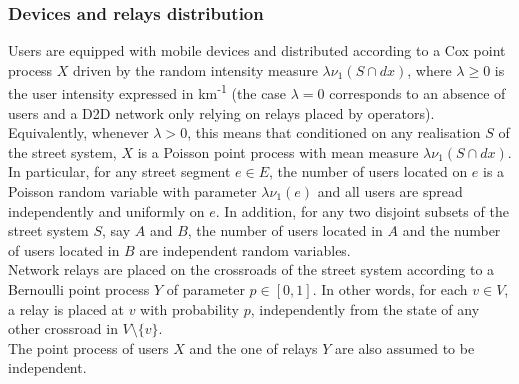 \documentclass[conference]{IEEEtran}
\begin{document}
\subsubsection{Devices and relays distribution}
\indent Users are equipped with mobile devices and distributed according to a Cox point process $X$ driven by the random intensity measure $\lambda \nu_{1}(S \cap dx)$, where $\lambda \geq 0$ is the user intensity expressed in km\textsuperscript{-1} (the case $\lambda = 0$ corresponds to an absence of users and a D2D network only relying on relays placed by operators). Equivalently, whenever $\lambda > 0$, this means that conditioned on any realisation $S$ of the street system, $X$ is a Poisson point process with mean measure $\lambda \nu_{1}(S \cap dx)$. In particular, for any street segment $e \in E$, the number of users located on $e$ is a Poisson random variable with parameter $\lambda \nu_{1}(e)$ and all users are spread independently and uniformly on $e$. In addition, for any two disjoint subsets of the street system $S$, say $A$ and $B$, the number of users located in $A$ and the number of users located in $B$ are independent random variables.\\
\indent Network relays are placed on the crossroads of the street system according to a Bernoulli point process $Y$ of parameter $p \in \left[0,1\right]$. In other words, for each $v \in V$, a relay is placed at $v$ with probability $p$, independently from the state of any other crossroad in $V \setminus \lbrace v\rbrace$. \\
\indent The point process of users $X$ and the one of relays $Y$ are also assumed to be independent. \\
\end{document}
